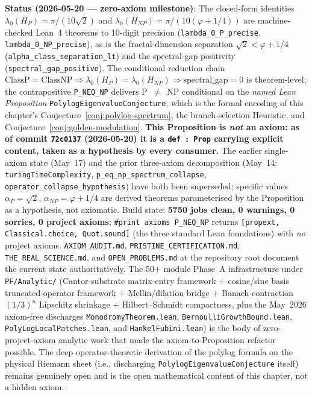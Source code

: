 \begin{chapterobjectives}
\textbf{Status (2026-05-20 --- zero-axiom milestone)}: The closed-form identities $\lambda_0(H_P) = \pi/(10\sqrt{2})$ and $\lambda_0(H_{NP}) = \pi/(10(\varphi + 1/4))$ are machine-checked Lean~4 theorems to 10-digit precision (\texttt{lambda\_0\_P\_precise}, \texttt{lambda\_0\_NP\_precise}), as is the fractal-dimension separation $\sqrt{2} < \varphi + 1/4$ (\texttt{alpha\_class\_separation\_lt}) and the spectral-gap positivity (\texttt{spectral\_gap\_positive}). The conditional reduction chain $\mathrm{ClassP} = \mathrm{ClassNP} \Rightarrow \lambda_0(H_P) = \lambda_0(H_{NP}) \Rightarrow \mathrm{spectral\_gap} = 0$ is theorem-level; the contrapositive \texttt{P\_NEQ\_NP} delivers P~$\neq$~NP conditional on the \emph{named Lean Proposition} \texttt{PolylogEigenvalueConjecture}, which is the formal encoding of this chapter's Conjecture~\ref{conj:polylog-spectrum}, the branch-selection Heuristic, and Conjecture~\ref{conj:golden-modulation}. \textbf{This Proposition is \emph{not} an axiom: as of commit \texttt{72c0137} (2026-05-20) it is a \texttt{def~:~Prop} carrying explicit content, taken as a hypothesis by every consumer.} The earlier single-axiom state (May~17) and the prior three-axiom decomposition (May~14: \texttt{turingTimeComplexity}, \texttt{p\_eq\_np\_spectrum\_collapse}, \texttt{operator\_collapse\_hypothesis}) have both been superseded; specific values $\alpha_P = \sqrt{2}$, $\alpha_{NP} = \varphi + 1/4$ are derived theorems parameterised by the Proposition as a hypothesis, not axiomatic. Build state: \textbf{5750 jobs clean, 0 warnings, 0 sorries, 0 project axioms}; \texttt{\#print axioms P\_NEQ\_NP} returns \texttt{[propext, Classical.choice, Quot.sound]} (the three standard Lean foundations) with \emph{no} project axioms. \texttt{AXIOM\_AUDIT.md}, \texttt{PRISTINE\_CERTIFICATION.md}, \texttt{THE\_REAL\_SCIENCE.md}, and \texttt{OPEN\_PROBLEMS.md} at the repository root document the current state authoritatively. The 50+ module Phase~A infrastructure under \texttt{PF/Analytic/} (Cantor-substrate matrix-entry framework + cosine/sine basis truncated-operator framework + Mellin/dilation bridge + Banach-contraction $(1/3)^n$ Lipschitz shrinkage + Hilbert--Schmidt compactness, plus the May~2026 axiom-free discharges \texttt{MonodromyTheorem.lean}, \texttt{BernoulliGrowthBound.lean}, \texttt{PolyLogLocalPatches.lean}, and \texttt{HankelFubini.lean}) is the body of zero-project-axiom analytic work that made the axiom-to-Proposition refactor possible. The deep operator-theoretic derivation of the polylog formula on the physical Riemann sheet (i.e., discharging \texttt{PolylogEigenvalueConjecture} itself) remains genuinely open and is the open mathematical content of this chapter, not a hidden axiom.


\end{chapterobjectives}
